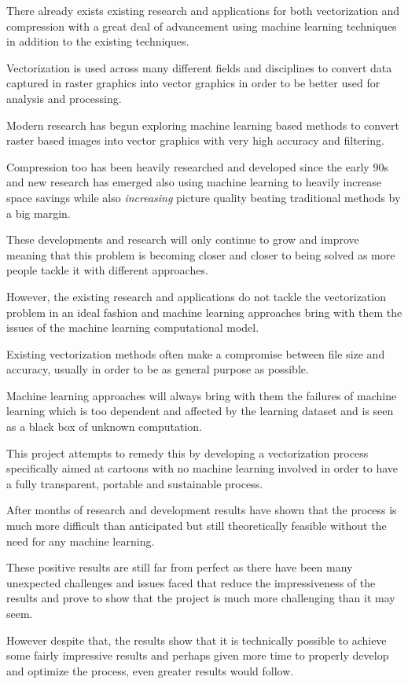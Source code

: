 \documentclass[12pt]{article}
\newcommand{\sentence}{} %
\newcommand{\italic}[1]{\textit{#1}}
\begin{document}
    \bigskip
    There already exists existing research and applications for both vectorization and compression with a great deal
    of advancement using machine learning techniques in addition to the existing techniques.
    \sentence
    Vectorization is used across many different fields and disciplines to convert data captured in raster graphics
    into vector graphics in order to be better used for analysis and processing.
    \sentence
    Modern research has begun exploring machine learning based methods to convert raster based images into vector
    graphics with very high accuracy and filtering.
    \sentence
    Compression too has been heavily researched and developed since the early 90s and new research has emerged also
    using machine learning to heavily increase space savings while also \italic{increasing} picture quality beating
    traditional methods by a big margin.
    \sentence
    These developments and research will only continue to grow and improve meaning that this problem is becoming
    closer and closer to being solved as more people tackle it with different approaches.

    \bigskip
    However, the existing research and applications do not tackle the vectorization problem in an ideal fashion and
    machine learning approaches bring with them the issues of the machine learning computational model.
    \sentence
    Existing vectorization methods often make a compromise between file size and accuracy, usually in order to be as
    general purpose as possible.
    \sentence
    Machine learning approaches will always bring with them the failures of machine learning which is too dependent
    and affected by the learning dataset and is seen as a black box of unknown computation.
    \sentence
    This project attempts to remedy this by developing a vectorization process specifically aimed at cartoons with no
    machine learning involved in order to have a fully transparent, portable and sustainable process.

    \bigskip
    After months of research and development results have shown that the process is much more difficult than
    anticipated but still theoretically feasible without the need for any machine learning.
    \sentence
    These positive results are still far from perfect as there have been many unexpected challenges and issues faced
    that reduce the impressiveness of the results and prove to show that the project is much more challenging than it
    may seem.
    \sentence
    However despite that, the results show that it is technically possible to achieve some fairly impressive results
    and perhaps given more time to properly develop and optimize the process, even greater results would follow.
\end{document}
